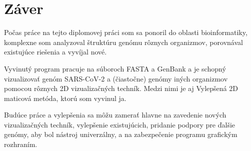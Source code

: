 
\chapter{Záver}
\label{summary}

Počas práce na tejto diplomovej práci som sa ponoril do oblasti bioinformatiky, komplexne som analyzoval štruktúru genómu rôznych organizmov, porovnával existujúce riešenia a vyvíjal nové.

Vyvinutý program pracuje na súboroch FASTA a GenBank a je schopný vizualizovať genóm SARS-CoV-2 a (čiastočne) genómy iných organizmov pomocou rôznych 2D vizualizačných techník.
Medzi nimi je aj Vylepšená 2D maticová metóda, ktorú som vyvinul ja.

Budúce práce a vylepšenia sa môžu zamerať hlavne na zavedenie nových vizualizačných techník, vylepšenie existujúcich, pridanie podpory pre ďalšie genómy, aby bol nástroj univerzálny, a na zabezpečenie programu grafickým rozhraním.